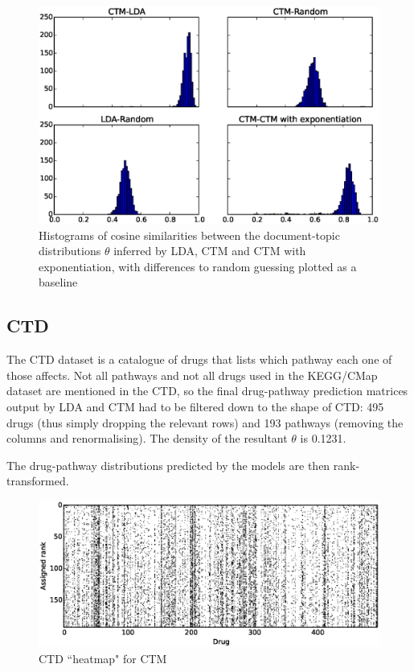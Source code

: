 \documentclass[12pt,a4paper,twoside,openright]{report}
\begin{document}
\begin{figure}[!htb]
\includegraphics[width=\textwidth]{ctd-ctm-lda-diffs.eps}
\caption{Histograms of cosine similarities between the document-topic distributions $\theta$ inferred by LDA, CTM and CTM with exponentiation, with differences to random guessing plotted as a baseline}
\label{fig:ctd-ctm-lda-diffs}
\end{figure}

\subsection{CTD}

The CTD dataset is a catalogue of drugs that lists which pathway each one of those affects. Not all pathways and not all drugs used in the KEGG/CMap dataset are mentioned in the CTD, so the final drug-pathway prediction matrices output by LDA and CTM had to be filtered down to the shape of CTD: 495 drugs (thus simply dropping the relevant rows) and 193 pathways (removing the columns and renormalising). The density of the resultant $\theta$ is 0.1231.

The drug-pathway distributions predicted by the models are then rank-transformed.

\begin{figure}[!htb]
\includegraphics[width=\textwidth]{ctm-ctd-heatmap.eps}
\caption{CTD ``heatmap" for CTM}
\label{fig:ctm-ctd-heatmap}
\end{figure}
\end{document}
